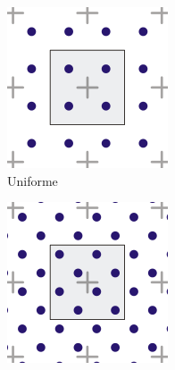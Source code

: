 \begin{figure}[htbp]
    \centering
    \begin{subfigure}[b]{0.25\textwidth}
        \centering
        \includegraphics[width=\textwidth]{Plantilla-TFG-master/img/aa1.png}
        \caption{Uniforme}
    \end{subfigure}
    \hfill
    \begin{subfigure}[b]{0.25\textwidth}
        \centering
        \includegraphics[width=\textwidth]{Plantilla-TFG-master/img/aa2.png}

\end{subfigure}
\end{figure}
